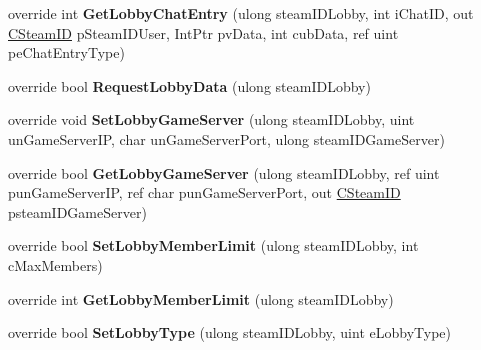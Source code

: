 \begin{DoxyCompactItemize}
override int {\bfseries Get\+Lobby\+Chat\+Entry} (ulong steam\+I\+D\+Lobby, int i\+Chat\+ID, out \hyperlink{struct_valve_1_1_steamworks_1_1_c_steam_i_d}{C\+Steam\+ID} p\+Steam\+I\+D\+User, Int\+Ptr pv\+Data, int cub\+Data, ref uint pe\+Chat\+Entry\+Type)
\item 
\mbox{\label{class_valve_1_1_steamworks_1_1_c_steam_matchmaking_ab2b1d1c01666607e4ef2e10aed13297e}} 
override bool {\bfseries Request\+Lobby\+Data} (ulong steam\+I\+D\+Lobby)
\item 
\mbox{\label{class_valve_1_1_steamworks_1_1_c_steam_matchmaking_a39423a9b0d30b422c2463be963869f28}} 
override void {\bfseries Set\+Lobby\+Game\+Server} (ulong steam\+I\+D\+Lobby, uint un\+Game\+Server\+IP, char un\+Game\+Server\+Port, ulong steam\+I\+D\+Game\+Server)
\item 
\mbox{\label{class_valve_1_1_steamworks_1_1_c_steam_matchmaking_ac8684d1a73f703202120bc15c9a11808}} 
override bool {\bfseries Get\+Lobby\+Game\+Server} (ulong steam\+I\+D\+Lobby, ref uint pun\+Game\+Server\+IP, ref char pun\+Game\+Server\+Port, out \hyperlink{struct_valve_1_1_steamworks_1_1_c_steam_i_d}{C\+Steam\+ID} psteam\+I\+D\+Game\+Server)
\item 
\mbox{\label{class_valve_1_1_steamworks_1_1_c_steam_matchmaking_a22a95b8f8d84d08fc2cd261d75ca52fc}} 
override bool {\bfseries Set\+Lobby\+Member\+Limit} (ulong steam\+I\+D\+Lobby, int c\+Max\+Members)
\item 
\mbox{\label{class_valve_1_1_steamworks_1_1_c_steam_matchmaking_af94df90350e3a181f518bf637d171624}} 
override int {\bfseries Get\+Lobby\+Member\+Limit} (ulong steam\+I\+D\+Lobby)
\item 
\mbox{\label{class_valve_1_1_steamworks_1_1_c_steam_matchmaking_ad7d565b58baddd445d8ed793bb1f33f3}} 
override bool {\bfseries Set\+Lobby\+Type} (ulong steam\+I\+D\+Lobby, uint e\+Lobby\+Type)
\item 
\mbox{\label{class_valve_1_1_steamworks_1_1_c_steam_matchmaking_a9cc498c181e2cd82b93ed0cdc1df19cd}} 

\end{DoxyCompactItemize}

